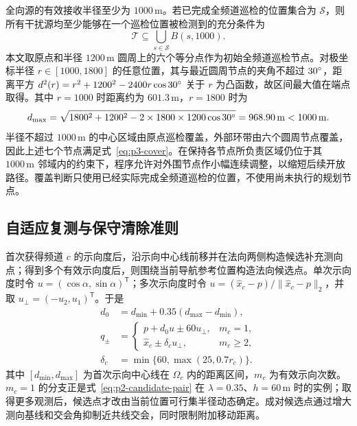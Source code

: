 全向源的有效接收半径至少为 $1000\,\mathrm m$。若已完成全频道巡检的位置集合为 $\mathcal S$，则所有干扰源均至少能够在一个巡检位置被检测到的充分条件为
\begin{equation}
  \mathcal T\subseteq\bigcup_{s\in\mathcal S}B(s,1000).
  \label{eq:p3-cover}
\end{equation}
本文取原点和半径 $1200\,\mathrm m$ 圆周上的六个等分点作为初始全频道巡检节点。对极坐标半径 $r\in[1000,1800]$ 的任意位置，其与最近圆周节点的夹角不超过 $30^{\circ}$，距离平方
$d^2(r)=r^2+1200^2-2400r\cos30^{\circ}$ 关于 $r$ 为凸函数，故区间最大值在端点取得。其中 $r=1000$ 时距离约为 $601.3\,\mathrm m$，$r=1800$ 时为
\begin{equation}
  d_{\max}=
  \sqrt{1800^2+1200^2-2\times1800\times1200\cos30^{\circ}}
  =968.90\,\mathrm m<1000\,\mathrm m.
  \label{eq:p3-cover-proof}
\end{equation}
半径不超过 $1000\,\mathrm m$ 的中心区域由原点巡检覆盖，外部环带由六个圆周节点覆盖，因此上述七个节点满足式~\eqref{eq:p3-cover}。在保持各节点所负责区域仍位于其 $1000\,\mathrm m$ 邻域内的约束下，程序允许对外围节点作小幅连续调整，以缩短后续开放路径。覆盖判断只使用已经实际完成全频道巡检的位置，不使用尚未执行的规划节点。

\subsection{自适应复测与保守清除准则}

首次获得频道 $c$ 的示向度后，沿示向中心线前移并在法向两侧构造候选补充测向点；得到多个有效示向度后，则围绕当前导航参考位置构造法向候选点。单次示向度时令 $u=(\cos\alpha,\sin\alpha)^{\mathsf T}$；多次示向度时令 $u=(\hat x_c-p)/\|\hat x_c-p\|_2$，并取 $u_\perp=(-u_2,u_1)^{\mathsf T}$。于是
\begin{equation}
\begin{aligned}
d_0&=d_{\min}+0.35(d_{\max}-d_{\min}),\\
q_{\pm}&=\begin{cases}
p+d_0u\pm60u_\perp, & m_c=1,\\
\hat x_c\pm\delta_cu_\perp, & m_c\ge2,
\end{cases}\\
\delta_c&=\min\{60,\max(25,0.7r_c)\}.
\end{aligned}
\label{eq:p3-remeasure}
\end{equation}
其中 $[d_{\min},d_{\max}]$ 为首次示向中心线在 $\Omega_c$ 内的距离区间，$m_c$ 为有效示向次数。$m_c=1$ 的分支正是式~\eqref{eq:p2-candidate-pair} 在 $\lambda=0.35$、$h=60\,\mathrm m$ 时的实例；取得更多观测后，候选点才改由当前位置可行集半径动态确定。成对候选点通过增大测向基线和交会角抑制近共线交会，同时限制附加移动距离。

